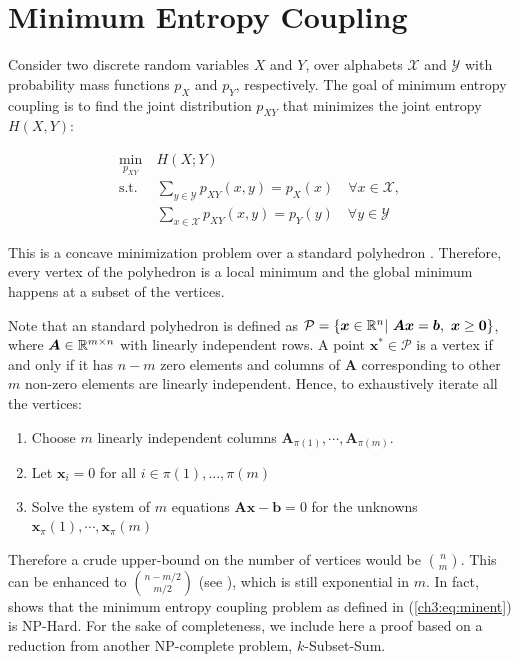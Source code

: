 \section{Minimum Entropy Coupling}\label{ch3:sec:MEC}

Consider two discrete random variables $X$ and $Y$, over alphabets $\mathcal{X}$ and $\mathcal{Y}$ with probability mass functions $p_X$ and $p_Y$, respectively. The goal of minimum entropy coupling is to find the joint distribution $p_{XY}$ that minimizes the joint entropy $H(X,Y)$:

\begin{equation} 
\begin{aligned} \label{ch3:eq:minent}
    \min_{p_{XY}} \ &H(X;Y) \\
    \textrm{s.t.} \
        &\sum_{y\in\mathcal{Y}} p_{XY}(x, y) = p_X(x) \quad \forall x\in{\mathcal{X}},  \\
        &\sum_{x\in\mathcal{X}} p_{XY}(x, y) = p_Y(y) \quad \forall y\in{\mathcal{Y}}
\end{aligned}
\end{equation}

This is a concave minimization problem over a standard polyhedron \cite{Mangasarian1996}. Therefore, every vertex of the polyhedron is a local minimum and the global minimum happens at a subset of the vertices.

Note that an standard polyhedron is defined as $\mathcal{P}=\{\bm{x} \in \mathbb{R}^n | \ \bm{A}\bm{x} = \bm{b}, \ \bm{x} \geq \bm{0}\}$, where $\bm{A} \in \mathbb{R} ^{m \times n}$ with linearly independent rows. A point $\bm{x}^* \in \mathcal{P}$ is a vertex if and only if it has $n-m$ zero elements and columns of $\bm{A}$ corresponding to other $m$ non-zero elements are linearly independent. Hence, to exhaustively iterate all the vertices:
\begin{enumerate}
    \item Choose $m$ linearly independent columns $\bm{A}_{\pi(1)}, \cdots, \bm{A}_{\pi(m)}$.
    \item Let $\bm{x}_i= 0$ for all  $i \in \pi(1),..., \pi(m)$
    \item Solve the system of $m$ equations $\bm{A}\bm{x} - \bm{b}=0$ for the unknowns $\bm{x}_\pi(1), \cdots, \bm{x}_\pi(m)$
\end{enumerate}

Therefore a crude upper-bound on the number of vertices would be $\binom{n} {m}$. This can be enhanced to $\binom{n-m/2}{m/2}$ (see \cite{goemans}), which is still exponential in $m$. 
In fact, \cite{kovavcevic2015entropy} shows that the minimum entropy coupling problem as defined in (\ref{ch3:eq:minent}) is NP-Hard. For the sake of completeness, we include here a proof based on a reduction from another NP-complete problem, $k$-Subset-Sum.

